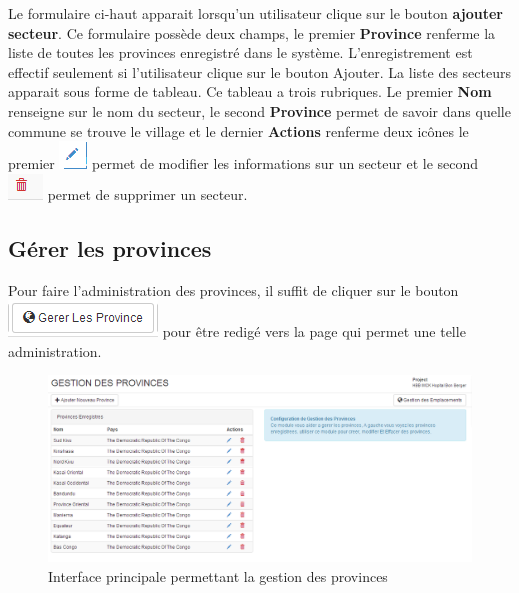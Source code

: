 \documentclass[12pt,a4paper]{report}
\begin{document}
Le formulaire ci-haut apparait lorsqu'un utilisateur clique sur le bouton \textbf{ajouter secteur}. Ce formulaire possède deux champs, le premier \textbf{Province} renferme la liste de toutes les provinces enregistré dans le système. 
L'enregistrement est effectif seulement si l'utilisateur clique sur le bouton Ajouter. La liste des secteurs apparait sous forme de tableau. Ce tableau a trois rubriques. Le premier\textbf{ Nom} renseigne sur le nom du secteur, le second \textbf{Province} permet de savoir dans quelle commune se trouve le village et le dernier \textbf{Actions} renferme deux icônes le premier 
\includegraphics[scale=0.7]{pic/EditUser.png}  permet de modifier les informations sur un secteur et le second 
 \includegraphics[scale=0.7]{pic/DeleteWRed.png}  permet de supprimer un secteur.
\subsection{Gérer les provinces}
Pour faire l'administration des provinces, il suffit de cliquer sur le bouton \includegraphics[scale=0.7]{pic/AdminProvince.png} pour être redigé vers la page qui permet une telle administration.
\begin{figure}[h]
\begin{center}
\includegraphics[width=14cm]{pic/InterfaceGestionProvince.png}
\end{center}
\caption{Interface principale permettant la gestion des provinces}
\label{Interface principale permettant la gestion des provinces}
\end{figure}
\end{document}
